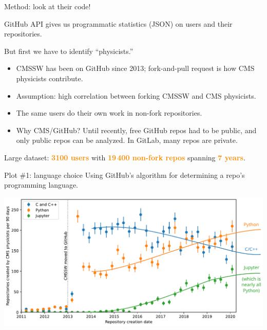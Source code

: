 \documentclass[aspectratio=169]{beamer}
\begin{document}
\begin{frame}{Method: look at their code!}
\Large

\vspace{0.5 cm}
GitHub API gives us programmatic statistics (JSON) on users and their repositories.

\vspace{0.5 cm}
But first we have to identify ``physicists.''
\large

\vspace{0.5 cm}
\begin{itemize}
\item CMSSW has been on GitHub since 2013; fork-and-pull request is how CMS physicists contribute.
\item Assumption: high correlation between forking CMSSW and CMS physicists.
\item The same users do their own work in non-fork repositories.
\item Why CMS/GitHub? Until recently, free GitHub repos had to be public, and only public repos can be analyzed. In GitLab, many repos are private.
\end{itemize}

\vspace{0.25 cm}
Large dataset: \textcolor{darkorange}{\bf 3100 users} with \textcolor{darkorange}{\bf 19\,400 non-fork repos} spanning \textcolor{darkorange}{\bf 7 years}.
\end{frame}

\begin{frame}{Plot \#1: language choice}
\vspace{0.25 cm}
Using GitHub's algorithm for determining a repo's programming language.

\vspace{0.15 cm}
\includegraphics[width=\linewidth]{01-github-cmssw-language.pdf}
\end{frame}
\end{document}
